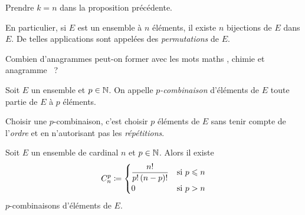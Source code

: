 \documentclass{magnolia}
\begin{document}
\begin{preuve}
Prendre $k=n$ dans la proposition précédente.
\end{preuve}

\begin{remarqueUnique}
\remarque En particulier, si $E$ est un ensemble à $n$ éléments, il existe $n$ bijections de $E$ dans $E$.
  De telles applications sont appelées des \emph{permutations} de $E$.
\end{remarqueUnique}

\begin{exoUnique}
\exo Combien d'anagrammes peut-on former avec les mots \og maths \fg, \og chimie \fg et
  \og anagramme \fg~?
\end{exoUnique}

\begin{definition}[nom={$p$-combinaisons}]
Soit $E$ un ensemble et $p\in\mathbb{N}$. On appelle \emph{$p$-combinaison} d'éléments de $E$ toute
partie de $E$ à $p$ éléments.
\end{definition}

\begin{remarqueUnique}
\remarque Choisir une $p$-combinaison, c'est choisir $p$ éléments de $E$ sans tenir compte
  de l'\emph{ordre} et en n'autorisant pas les \emph{répétitions}.
\end{remarqueUnique}

\begin{proposition}[nom={Nombre de combinaisons}]
Soit $E$ un ensemble de cardinal $n$ et $p\in\mathbb{N}$. Alors il existe
\[C_n^p\coloneqq
    \begin{cases}
    \displaystyle\frac{n!}{p!\left(n-p\right)!} & \text{si $p\leqslant n$}\\
    0 & {\text{si $p>n$}}
    \end{cases}\]
$p$-combinaisons d'éléments de $E$.
\end{proposition}
\end{document}

